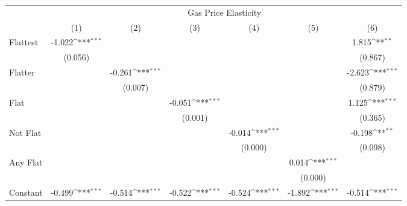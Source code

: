 {
\def\sym#1{\ifmmode^{#1}\else\(^{#1}\)\fi}
\begin{tabular}{l*{6}{c}}
\hline\hline
            &\multicolumn{6}{c}{Gas Price Elasticity}                                                                                           \\
            &\multicolumn{1}{c}{(1)}         &\multicolumn{1}{c}{(2)}         &\multicolumn{1}{c}{(3)}         &\multicolumn{1}{c}{(4)}         &\multicolumn{1}{c}{(5)}         &\multicolumn{1}{c}{(6)}         \\
\hline
Flattest    &      -1.022\sym{***}&                     &                     &                     &                     &       1.815\sym{**} \\
            &     (0.056)         &                     &                     &                     &                     &     (0.867)         \\
[1em]
Flatter     &                     &      -0.261\sym{***}&                     &                     &                     &      -2.623\sym{***}\\
            &                     &     (0.007)         &                     &                     &                     &     (0.879)         \\
[1em]
Flat        &                     &                     &      -0.051\sym{***}&                     &                     &       1.125\sym{***}\\
            &                     &                     &     (0.001)         &                     &                     &     (0.365)         \\
[1em]
Not Flat    &                     &                     &                     &      -0.014\sym{***}&                     &      -0.198\sym{**} \\
            &                     &                     &                     &     (0.000)         &                     &     (0.098)         \\
[1em]
Any Flat    &                     &                     &                     &                     &       0.014\sym{***}&                     \\
            &                     &                     &                     &                     &     (0.000)         &                     \\
[1em]
Constant    &      -0.499\sym{***}&      -0.514\sym{***}&      -0.522\sym{***}&      -0.524\sym{***}&      -1.892\sym{***}&      -0.514\sym{***}\\

\end{tabular}}
